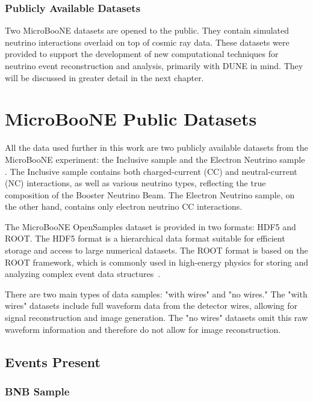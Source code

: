\documentclass{pracalicmgr}
\begin{document}
\subsection{Publicly Available Datasets}

Two MicroBooNE datasets are opened to the public. They contain simulated neutrino interactions overlaid on top of cosmic ray data. These datasets were provided to support the development of new computational techniques for neutrino event reconstruction and analysis, primarily with DUNE in mind. They will be discussed in greater detail in the next chapter.

\chapter{MicroBooNE Public Datasets}

All the data used further in this work are two publicly available datasets from the MicroBooNE experiment: the Inclusive sample and the Electron Neutrino sample \cite{ubooneOpenSamples}. The Inclusive sample contains both charged-current (CC) and neutral-current (NC) interactions, as well as various neutrino types, reflecting the true composition of the Booster Neutrino Beam. The Electron Neutrino sample, on the other hand, contains only electron neutrino CC interactions.

The MicroBooNE OpenSamples dataset is provided in two formats: HDF5 and ROOT. The HDF5 format is a hierarchical data format suitable for efficient storage and access to large numerical datasets. The ROOT format is based on the ROOT framework, which is commonly used in high-energy physics for storing and analyzing complex event data structures~\cite{hdf5,root}. 

There are two main types of data samples: "with wires" and "no wires." The "with wires" datasets include full waveform data from the detector wires, allowing for signal reconstruction and image generation. The "no wires" datasets omit this raw waveform information and therefore do not allow for image reconstruction.

\section{Events Present}

\subsection{BNB Sample}
\end{document}
